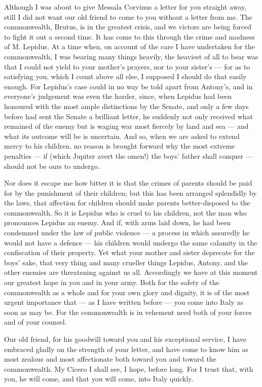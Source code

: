 

 Although I was about to give Messala Corvinus a letter for you straight away, still I did not want our old friend to come to you without a letter from me. The commonwealth, Brutus, is in the greatest crisis, and we victors are being forced to fight it out a second time. It has come to this through the crime and madness of M. Lepidus. At a time when, on account of the care I have undertaken for the commonwealth, I was bearing many things heavily, the heaviest of all to bear was that I could not yield to your mother's prayers, nor to your sister's --- for as to satisfying you, which I count above all else, I supposed I should do that easily enough. For Lepidus's case could in no way be told apart from Antony's, and in everyone's judgement was even the harder, since, when Lepidus had been honoured with the most ample distinctions by the Senate, and only a few days before had sent the Senate a brilliant letter, he suddenly not only received what remained of the enemy but is waging war most fiercely by land and sea --- and what its outcome will be is uncertain. And so, when we are asked to extend mercy to his children, no reason is brought forward why the most extreme penalties --- if (which Jupiter avert the omen!) the boys' father shall conquer --- should not be ours to undergo.

 Nor does it escape me how bitter it is that the crimes of parents should be paid for by the punishment of their children; but this has been arranged splendidly by the laws, that affection for children should make parents better-disposed to the commonwealth. So it is Lepidus who is cruel to his children, not the man who pronounces Lepidus an enemy. And if, with arms laid down, he had been condemned under the law of public violence --- a process in which assuredly he would not have a defence --- his children would undergo the same calamity in the confiscation of their property. Yet what your mother and sister deprecate for the boys' sake, that very thing and many crueller things Lepidus, Antony, and the other enemies are threatening against us all. Accordingly we have at this moment our greatest hope in you and in your army. Both for the safety of the commonwealth as a whole and for your own glory and dignity, it is of the most urgent importance that --- as I have written before --- you come into Italy as soon as may be. For the commonwealth is in vehement need both of your forces and of your counsel.

 Our old friend, for his goodwill toward you and his exceptional service, I have embraced gladly on the strength of your letter, and have come to know him as most zealous and most affectionate both toward you and toward the commonwealth. My Cicero I shall see, I hope, before long. For I trust that, with you, he will come, and that you will come, into Italy quickly.
